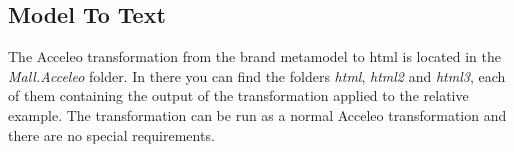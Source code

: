 \documentclass[a4paper]{article}
\begin{document}
\subsection{Model To Text}
The Acceleo transformation from the brand metamodel to html is located in the \textit{Mall.Acceleo} folder. In there you can find the folders \textit{html}, \textit{html2} and \textit{html3}, each of them containing the output of the transformation applied to the relative example.
The transformation can be run as a normal Acceleo transformation and there are no special requirements.
	
\end{document}
